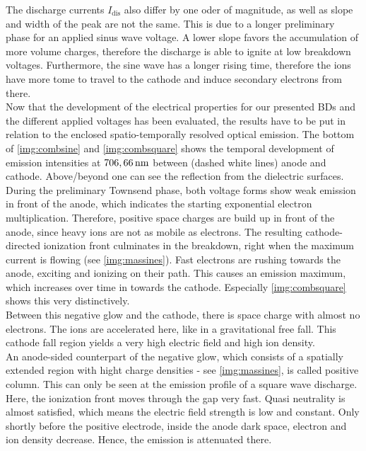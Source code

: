 \documentclass[a4paper,10pt,twoside]{article}
\newcommand{\ix}[1]{_\text{#1}}
\begin{document}
		The discharge currents $I\ix{dis}$ also differ by one oder of magnitude, as well as slope and width of the peak are not the same. This is due to a longer preliminary phase for an applied sinus wave voltage. A lower slope favors the accumulation of more volume charges, therefore the discharge is able to ignite at low breakdown voltages. Furthermore, the sine wave has a longer rising time, therefore the ions have more tome to travel to the cathode and induce secondary electrons from there.\\					
		Now that the development of the electrical properties for our presented BDs and the different applied voltages has been evaluated, the results have to be put in relation to the enclosed spatio-temporally resolved optical emission. The bottom of \autoref{img:combsine} and \autoref{img:combsquare} shows the temporal development of emission intensities at $\unit[706,66]{nm}$ between (dashed white lines) anode and cathode. Above/beyond one can see the reflection from the dielectric surfaces.\\
		During the preliminary Townsend phase, both voltage forms show weak emission in front of the anode, which indicates the starting exponential electron multiplication. Therefore, positive space charges are build up in front of the anode, since heavy ions are not as mobile as electrons. The resulting cathode-directed ionization front culminates in the breakdown, right when the maximum current is flowing (see \autoref{img:massines}). Fast electrons are rushing towards the anode, exciting and ionizing on their path. This causes an emission maximum, which increases over time in towards the cathode. Especially \autoref{img:combsquare} shows this very distinctively.\\
		Between this negative glow and the cathode, there is space charge with almost no electrons. The ions are accelerated here, like in a gravitational free fall. This cathode fall region yields a very high electric field and high ion density.\\
		An anode-sided counterpart of the negative glow, which consists of a spatially extended region with hight charge densities - see \autoref{img:massines}, is called positive column. This can only be seen at the emission profile of a square wave discharge. Here, the ionization front moves through the gap very fast. Quasi neutrality is almost satisfied, which means the electric field strength is low and constant. Only shortly before the positive electrode, inside the anode dark space, electron and ion density decrease. Hence, the emission is attenuated there.\\
\end{document}
